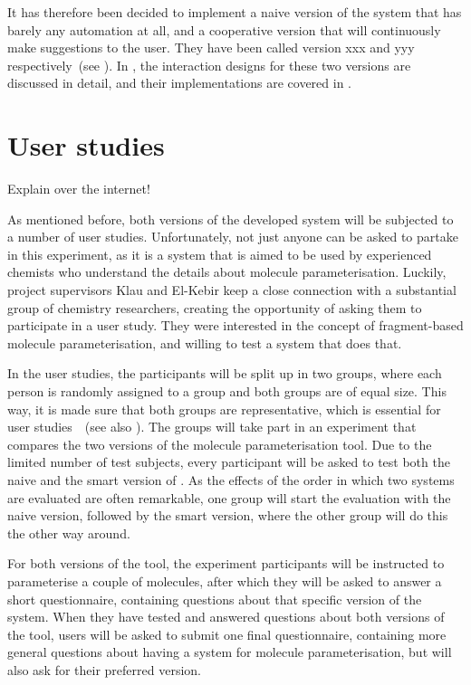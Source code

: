 It has therefore been decided to implement a naive version of the system that has barely any automation at all, and a cooperative version that will continuously make suggestions to the user. They have been called version xxx and yyy respectively~(see ). In , the interaction designs for these two versions are discussed in detail, and their implementations are covered in .



\section{User studies}

\begin{todo}
\item Explain over the internet!
\end{todo}

As mentioned before, both versions of the developed system will be subjected to a number of user studies. Unfortunately, not just anyone can be asked to partake in this experiment, as it is a system that is aimed to be used by experienced chemists who understand the details about molecule parameterisation. Luckily, project supervisors Klau and El-Kebir keep a close connection with a substantial group of chemistry researchers, creating the opportunity of asking them to participate in a user study. They were interested in the concept of fragment-based molecule parameterisation, and willing to test a system that does that.

In the user studies, the participants will be split up in two groups, where each person is randomly assigned to a group and both groups are of equal size. This way, it is made sure that both groups are representative, which is essential for user studies~\cite{wohlin2003empirical}~(see also ). The groups will take part in an experiment that compares the two versions of the molecule parameterisation tool. Due to the limited number of test subjects, every participant will be asked to test both the naive and the smart version of \oframp. As the effects of the order in which two systems are evaluated are often remarkable, one group will start the evaluation with the naive version, followed by the smart version, where the other group will do this the other way around.

For both versions of the tool, the experiment participants will be instructed to parameterise a couple of molecules, after which they will be asked to answer a short questionnaire, containing questions about that specific version of the system. When they have tested and answered questions about both versions of the tool, users will be asked to submit one final questionnaire, containing more general questions about having a system for molecule parameterisation, but will also ask for their preferred version.

